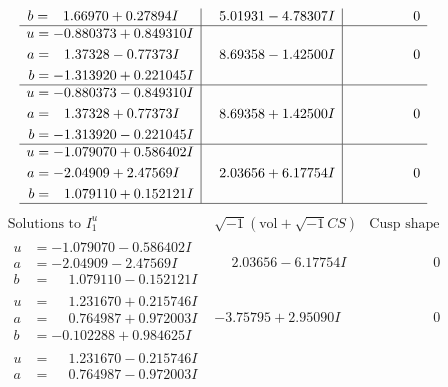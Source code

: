 \documentclass[1p]{elsarticle_modified}
\theoremstyle{definition}
\newcommand{\I}{\sqrt{-1}}
\begin{document}
$$\begin{array}{c|c|c}
\begin{aligned}
b &= \phantom{-}1.66970 + 0.27894 I\end{aligned}
 & \phantom{-}5.01931 - 4.78307 I & \phantom{-0.000000 } 0 \\ \hline\begin{aligned}
u &= -0.880373 + 0.849310 I \\
a &= \phantom{-}1.37328 - 0.77373 I \\
b &= -1.313920 + 0.221045 I\end{aligned}
 & \phantom{-}8.69358 - 1.42500 I & \phantom{-0.000000 } 0 \\ \hline\begin{aligned}
u &= -0.880373 - 0.849310 I \\
a &= \phantom{-}1.37328 + 0.77373 I \\
b &= -1.313920 - 0.221045 I\end{aligned}
 & \phantom{-}8.69358 + 1.42500 I & \phantom{-0.000000 } 0 \\ \hline\begin{aligned}
u &= -1.079070 + 0.586402 I \\
a &= -2.04909 + 2.47569 I \\
b &= \phantom{-}1.079110 + 0.152121 I\end{aligned}
 & \phantom{-}2.03656 + 6.17754 I & \phantom{-0.000000 } 0\\
 \hline 
 \end{array}$$\newpage$$\begin{array}{c|c|c}  
\text{Solutions to }I^u_{1}& \I (\text{vol} + \sqrt{-1}CS) & \text{Cusp shape}\\
 \hline 
\begin{aligned}
u &= -1.079070 - 0.586402 I \\
a &= -2.04909 - 2.47569 I \\
b &= \phantom{-}1.079110 - 0.152121 I\end{aligned}
 & \phantom{-}2.03656 - 6.17754 I & \phantom{-0.000000 } 0 \\ \hline\begin{aligned}
u &= \phantom{-}1.231670 + 0.215746 I \\
a &= \phantom{-}0.764987 + 0.972003 I \\
b &= -0.102288 + 0.984625 I\end{aligned}
 & -3.75795 + 2.95090 I & \phantom{-0.000000 } 0 \\ \hline\begin{aligned}
u &= \phantom{-}1.231670 - 0.215746 I \\
a &= \phantom{-}0.764987 - 0.972003 I \\

\end{aligned}
\end{array}$$
\end{document}
